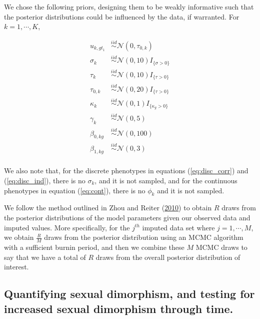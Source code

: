 \documentclass[
  12pt,
]{article}
\begin{document}
We chose the following priors, designing them to be weakly informative
such that the posterior distributions could be influenced by the data,
if warranted. For \(k = 1,\cdots,K\),

\begin{align}
u_{k,gt_1} & \overset{iid}{\sim}\mathcal{N}(0,\tau_{0,k}) \nonumber \\
\sigma_k & \overset{iid}{\sim}\mathcal{N}(0,10)I_{\{\sigma > 0\}} \nonumber \\
\tau_k & \overset{iid}{\sim}\mathcal{N}(0,10)I_{\{\tau > 0\}} \nonumber \\
\tau_{0,k} & \overset{iid}{\sim}\mathcal{N}(0,20)I_{\{\tau > 0\}} \nonumber \\
\kappa_k & \overset{iid}{\sim}\mathcal{N}(0,1)I_{\{\kappa_g > 0\}} \nonumber \\
\gamma_{k} & \overset{iid}{\sim}\mathcal{N}(0,5) \nonumber \\
\beta_{0,kg} & \overset{iid}{\sim}\mathcal{N}(0,100) \nonumber \\
\beta_{1,kg} & \overset{iid}{\sim}\mathcal{N}(0,3) \nonumber \\
\label{eq:priors}
\end{align}

We also note that, for the discrete phenotypes in equations
(\ref{eq:disc_corr}) and (\ref{eq:disc_ind}), there is no \(\sigma_k\),
and it is not sampled, and for the continuous phenotypes in equation
(\ref{eq:cont}), there is no \(\phi_k\) and it is not sampled.

We follow the method outlined in Zhou and Reiter
(\protect\hyperlink{ref-ZhouReiter2010}{2010}) to obtain \(R\) draws
from the posterior distributions of the model parameters given our
observed data and imputed values. More specifically, for the \(j^{th}\)
imputed data set where \(j = 1,\cdots,M\), we obtain \(\frac{R}{M}\)
draws from the posterior distribution using an MCMC algorithm with a
sufficient burnin period, and then we combine these \(M\) MCMC draws to
say that we have a total of \(R\) draws from the overall posterior
distribution of interest.

\hypertarget{quantifying-sexual-dimorphism-and-testing-for-increased-sexual-dimorphism-through-time.}{%
\subsection{Quantifying sexual dimorphism, and testing for increased
sexual dimorphism through
time.}\label{quantifying-sexual-dimorphism-and-testing-for-increased-sexual-dimorphism-through-time.}}
\end{document}
